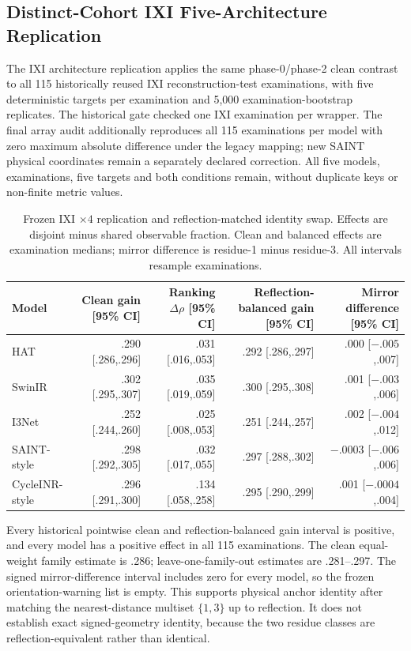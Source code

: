 \subsection{Distinct-Cohort IXI Five-Architecture Replication}
The IXI architecture replication applies the same phase-0/phase-2 clean contrast to all 115 historically reused IXI reconstruction-test examinations, with five deterministic targets per examination and 5,000 examination-bootstrap replicates. The historical gate checked one IXI examination per wrapper. The final array audit additionally reproduces all 115 examinations per model with zero maximum absolute difference under the legacy mapping; new SAINT physical coordinates remain a separately declared correction. All five models, examinations, five targets and both conditions remain, without duplicate keys or non-finite metric values.

\begin{table}[t]
\centering
\caption{Frozen IXI $\times4$ replication and reflection-matched identity swap. Effects are disjoint minus shared observable fraction. Clean and balanced effects are examination medians; mirror difference is residue-1 minus residue-3. All intervals resample examinations.}
\label{tab:p11-ixi-arch}
\setlength{\tabcolsep}{3.5pt}
\scriptsize
\begin{tabular}{lrrrr}
\toprule
Model & Clean gain [95\% CI] & Ranking $\Delta\rho$ [95\% CI] & Reflection-balanced gain [95\% CI] & Mirror difference [95\% CI] \\
\midrule
HAT & .290 [.286,.296] & .031 [.016,.053] & .292 [.286,.297] & .000 [$-.005$,.007] \\
SwinIR & .302 [.295,.307] & .035 [.019,.059] & .300 [.295,.308] & .001 [$-.003$,.006] \\
I3Net & .252 [.244,.260] & .025 [.008,.053] & .251 [.244,.257] & .002 [$-.004$,.012] \\
SAINT-style & .298 [.292,.305] & .032 [.017,.055] & .297 [.288,.302] & $-.0003$ [$-.006$,.006] \\
CycleINR-style & .296 [.291,.300] & .134 [.058,.258] & .295 [.290,.299] & .001 [$-.0004$,.004] \\
\bottomrule
\end{tabular}
\end{table}

Every historical pointwise clean and reflection-balanced gain interval is positive, and every model has a positive effect in all 115 examinations. The clean equal-weight family estimate is .286; leave-one-family-out estimates are .281--.297. The signed mirror-difference interval includes zero for every model, so the frozen orientation-warning list is empty. This supports physical anchor identity after matching the nearest-distance multiset $\{1,3\}$ up to reflection. It does not establish exact signed-geometry identity, because the two residue classes are reflection-equivalent rather than identical.

